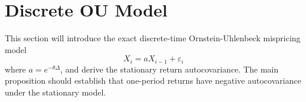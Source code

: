 \section{Discrete OU Model}

This section will introduce the exact discrete-time Ornstein-Uhlenbeck mispricing model
\[
X_i = a X_{i-1} + \varepsilon_i
\]
where \(a = e^{-\theta \Delta}\), and derive the stationary return autocovariance. The main proposition should establish that one-period returns have negative autocovariance under the stationary model.
